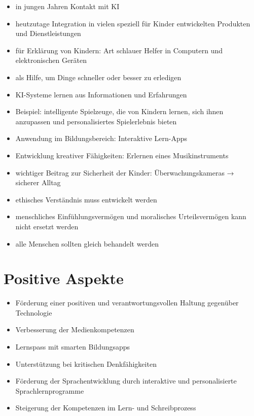 \documentclass{article}
\begin{document}
\begin{itemize}

    \item in jungen Jahren Kontakt mit KI
    \item heutzutage Integration in vielen speziell für Kinder entwickelten Produkten und Dienstleistungen
    \item für Erklärung von Kindern: Art schlauer Helfer in Computern und elektronischen Geräten
    \item als Hilfe, um Dinge schneller oder besser zu erledigen 
    \item KI-Systeme lernen aus Informationen und Erfahrungen
    \item Beispiel: intelligente Spielzeuge, die von Kindern lernen, sich ihnen anzupassen und personalisiertes Spielerlebnis bieten
    \item Anwendung im Bildungsbereich: Interaktive Lern-Apps
    \item Entwicklung kreativer Fähigkeiten: Erlernen eines Musikinstruments
    \item wichtiger Beitrag zur Sicherheit der Kinder: Überwachungskameras → sicherer Alltag
    \item ethisches Verständnis muss entwickelt werden
    \item menschliches Einfühlungsvermögen und moralisches Urteilsvermögen kann nicht ersetzt werden
    \item alle Menschen sollten gleich behandelt werden 
    
\end{itemize}  

\section{Positive Aspekte}

\begin{itemize}

    \item Förderung einer positiven und verantwortungsvollen Haltung gegenüber Technologie
    \item Verbesserung der Medienkompetenzen
    \item Lernspass mit smarten Bildungsapps
    \item Unterstützung bei kritischen Denkfähigkeiten
    \item Förderung der Sprachentwicklung durch interaktive und personalisierte Sprachlernprogramme
    \item Steigerung der Kompetenzen im Lern- und Schreibprozess

\end{itemize}
\end{document}
